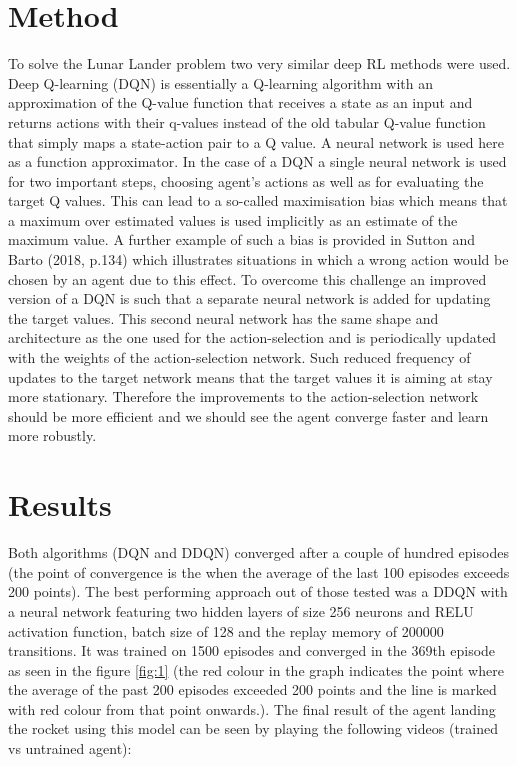 \documentclass{article}
\begin{document}
\section{Method}
To solve the Lunar Lander problem two very similar deep RL methods were used. Deep Q-learning (DQN) is essentially a Q-learning algorithm with an approximation of the Q-value function that receives a state as an input and returns actions with their q-values instead of the old tabular Q-value function that simply maps a state-action pair to a Q value. A neural network is used here as a function approximator. In the case of a DQN a single neural network is used for two important steps, choosing agent's actions as well as for evaluating the target Q values. This can lead to a so-called maximisation bias which means that a maximum over estimated values is used implicitly as an estimate of the maximum value. A further example of such a bias is provided in Sutton and Barto (2018, p.134) which illustrates situations in which a wrong action would be chosen by an agent due to this effect. To overcome this challenge an improved version of a DQN is such that a separate neural network is added for updating the target values. This second neural network has the same shape and architecture as the one used for the action-selection and is periodically updated with the weights of the action-selection network. Such reduced frequency of updates to the target network means that the target values it is aiming at stay more stationary. Therefore the improvements to the action-selection network should be more efficient and we should see the agent converge faster and learn more robustly.

\section{Results}
Both algorithms (DQN and DDQN) converged after a couple of hundred episodes (the point of convergence is the when the average of the last 100 episodes exceeds 200 points). The best performing approach out of those tested was a DDQN with a neural network featuring two hidden layers of size 256 neurons and RELU activation function, batch size of 128 and the replay memory of 200000 transitions. It was trained on 1500 episodes and converged in the 369th episode as seen in the figure \ref{fig:1} (the red colour in the graph indicates the point where the average of the past 200 episodes exceeded 200 points and the line is marked with red colour from that point onwards.). The final result of the agent landing the rocket using this model can be seen by playing the following videos (trained vs untrained agent):
\end{document}
